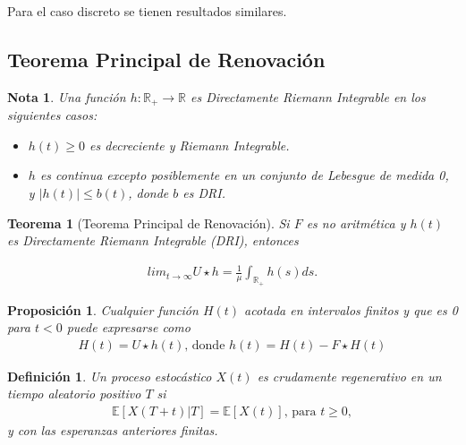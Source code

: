 \documentclass{article}
\newtheorem{Def}{Definición}[section]
\newtheorem{Teo}{Teorema}[section]
\newtheorem{Note}{Nota}[section]
\newtheorem{Prop}{Proposición}[section]
\newcommand{\rea}{\mathbb{R}}
\newcommand{\esp}{\mathbb{E}}
\numberwithin{equation}{section}
\begin{document}
Para el caso discreto se tienen resultados similares.

%
\subsection*{Teorema Principal de Renovaci\'on}

\begin{Note} Una funci\'on $h:\rea_{+}\rightarrow\rea$ es Directamente Riemann Integrable en los siguientes casos:
\begin{itemize}
\item[a)] $h\left(t\right)\geq0$ es decreciente y Riemann Integrable.
\item[b)] $h$ es continua excepto posiblemente en un conjunto de Lebesgue de medida 0, y $|h\left(t\right)|\leq b\left(t\right)$, donde $b$ es DRI.
\end{itemize}
\end{Note}

\begin{Teo}[Teorema Principal de Renovaci\'on]
Si $F$ es no aritm\'etica y $h\left(t\right)$ es Directamente Riemann Integrable (DRI), entonces

\begin{eqnarray}
lim_{t\rightarrow\infty}U\star h=\frac{1}{\mu}\int_{\rea_{+}}h\left(s\right)ds.
\end{eqnarray}
\end{Teo}

\begin{Prop}
Cualquier funci\'on $H\left(t\right)$ acotada en intervalos finitos y que es 0 para $t<0$ puede expresarse como
\begin{eqnarray}
H\left(t\right)=U\star h\left(t\right)\textrm{,  donde }h\left(t\right)=H\left(t\right)-F\star H\left(t\right)
\end{eqnarray}
\end{Prop}

\begin{Def}
Un proceso estoc\'astico $X\left(t\right)$ es crudamente regenerativo en un tiempo aleatorio positivo $T$ si
\begin{eqnarray}
\esp\left[X\left(T+t\right)|T\right]=\esp\left[X\left(t\right)\right]\textrm{, para }t\geq0,\end{eqnarray}
y con las esperanzas anteriores finitas.
\end{Def}
\end{document}
